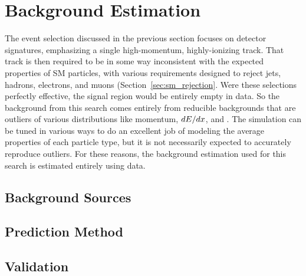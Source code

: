 \chapter{Background Estimation}

\label{ch:background}

The event selection discussed in the previous section focuses on detector signatures, emphasizing a single high-momentum, highly-ionizing track.
That track is then required to be in some way inconsistent with the expected properties of \ac{SM} particles, with various requirements designed to reject jets, hadrons, electrons, and muons (Section~\ref{sec:sm_rejection}.
Were these selections perfectly effective, the signal region would be entirely empty in data.
So the background from this search comes entirely from reducible backgrounds that are outliers of various distributions like momentum, $dE/dx$, and \ptcone.
The simulation can be tuned in various ways to do an excellent job of modeling the average properties of each particle type, but it is not necessarily expected to accurately reproduce outliers.
For these reasons, the background estimation used for this search is estimated entirely using data.


% 
%
%
%
%

\section{Background Sources}


\section{Prediction Method}


\section{Validation}

